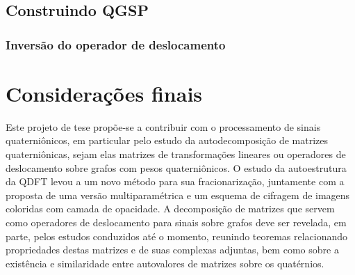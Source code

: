 \section{Construindo QGSP}

\subsection{Inversão do operador de deslocamento}

%
%

\chapter[Considera\c c\~oes finais]{Considera\c c\~oes finais}
\label{ch:others}

Este projeto de tese prop\~oe-se a contribuir com o processamento de sinais quaterni\^onicos, em particular pelo estudo da autodecomposi\c c\~ao de matrizes quaterni\^onicas, sejam elas matrizes de transforma\c c\~oes lineares ou operadores de deslocamento sobre grafos com pesos quaterni\^onicos. O estudo da autoestrutura da QDFT levou a um novo m\'etodo para sua fracionariza\c c\~ao, juntamente com a proposta de uma vers\~ao multiparam\'etrica e um esquema de cifragem de imagens coloridas com camada de opacidade. A decomposi\c c\~ao de matrizes que servem como operadores de deslocamento para sinais sobre grafos deve ser revelada, em parte, pelos estudos conduzidos at\'e o momento, reunindo teoremas relacionando propriedades destas matrizes e de suas complexas adjuntas, bem como sobre a exist\^encia e similaridade entre autovalores de matrizes sobre os quat\'ernios.

